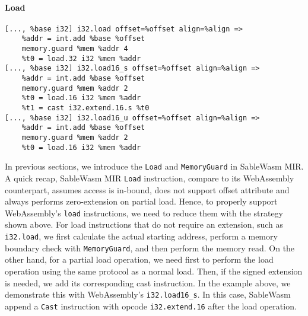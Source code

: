 \paragraph{Load} \quad
\begin{lstlisting}[basicstyle=\linespread{0.8}\small, language=SableWasmMIR]
[..., %base i32] i32.load offset=%offset align=%align =>
    %addr = int.add %base %offset
    memory.guard %mem %addr 4
    %t0 = load.32 i32 %mem %addr
[..., %base i32] i32.load16_s offset=%offset align=%align =>
    %addr = int.add %base %offset
    memory.guard %mem %addr 2
    %t0 = load.16 i32 %mem %addr
    %t1 = cast i32.extend.16.s %t0
[..., %base i32] i32.load16_u offset=%offset align=%align =>
    %addr = int.add %base %offset
    memory.guard %mem %addr 2
    %t0 = load.16 i32 %mem %addr
\end{lstlisting}
In previous sections, we introduce the \texttt{Load} and \texttt{MemoryGuard} in SableWasm MIR. A quick recap, SableWasm MIR \texttt{Load} instruction, compare to its WebAssembly counterpart, assumes access is in-bound, does not support offset attribute and always performs zero-extension on partial load. Hence, to properly support WebAssembly's \texttt{load} instructions, we need to reduce them with the strategy shown above. For load instructions that do not require an extension, such as \texttt{i32.load}, we first calculate the actual starting address, perform a memory boundary check with \texttt{MemoryGuard}, and then perform the memory read. On the other hand, for a partial load operation, we need first to perform the load operation using the same protocol as a normal load. Then, if the signed extension is needed, we add its corresponding cast instruction. In the example above, we demonstrate this with WebAssembly's \texttt{i32.load16\_s}. In this case, SableWasm append a \texttt{Cast} instruction with opcode \texttt{i32.extend.16} after the load operation.


